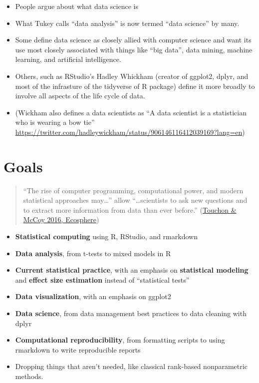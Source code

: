 \documentclass[]{book}
\providecommand{\tightlist}{%
  \setlength{\itemsep}{0pt}\setlength{\parskip}{0pt}}
\theoremstyle{definition}
\theoremstyle{definition}
\theoremstyle{definition}
\theoremstyle{remark}
\begin{document}
\begin{itemize}
\tightlist
\item
  People argue about what data science is
\item
  What Tukey calls ``data analysis'' is now termed ``data science'' by
  many.\\
\item
  Some define data science as closely allied with computer science and
  want its use most closely associated with things like ``big data'',
  data mining, machine learning, and artificial intelligence.
\item
  Others, such as RStudio's Hadley Whickham (creator of ggplot2, dplyr,
  and most of the infrasture of the tidyverse of R package) define it
  more broadly to involve all aspects of the life cycle of data.
\item
  (Wickham also defines a data scientists as ``A data scientist is a
  statistician who is wearing a bow tie''
  \url{https://twitter.com/hadleywickham/status/906146116412039169?lang=en})
\end{itemize}

\section{Goals}\label{goals}

\begin{quote}
``The rise of computer programming, computational power, and modern
statistical approaches may\ldots{}'' allow ``\ldots{}scientists to ask
new questions and to extract more information from data than ever
before.''
(\href{https://esajournals.onlinelibrary.wiley.com/doi/abs/10.1002/ecs2.1394}{Touchon
\& McCoy 2016, Ecosphere})
\end{quote}

\begin{itemize}
\tightlist
\item
  \textbf{Statistical computing} using R, RStudio, and rmarkdown
\item
  \textbf{Data analysis}, from t-tests to mixed models in R
\item
  \textbf{Current statistical practice}, with an emphasis on
  \textbf{statistical modeling} and \textbf{effect size estimation}
  instead of ``statistical tests''
\item
  \textbf{Data visualization}, with an emphasis on ggplot2
\item
  \textbf{Data science}, from data management best practices to data
  cleaning with dplyr
\item
  \textbf{Computational reproducibility}, from formatting scripts to
  using rmarkdown to write reproducible reports
\item
  Dropping things that aren't needed, like classical rank-based
  nonparametric methods.
\end{itemize}
\end{document}
